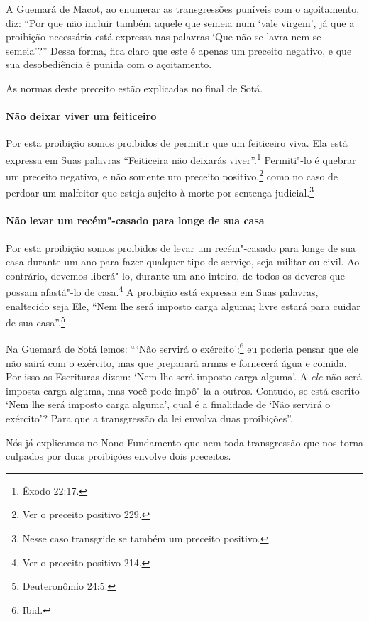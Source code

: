 \begin{multicols}{2}
A Guemará\starr{} de Macot\starr, ao enumerar as transgressões puníveis com o
açoitamento, diz: ``Por que não incluir também aquele que semeia num
`vale virgem', já que a proibição necessária está expressa nas palavras
`Que não se lavra nem se semeia'?'' Dessa forma, fica claro que este é
apenas um preceito negativo, e que sua desobediência é punida com o
açoitamento.

As normas deste preceito estão explicadas no final de Sotá\starr.

\paragraph{Não deixar viver um feiticeiro}

Por esta proibição somos proibidos de permitir que um feiticeiro viva.
Ela está expressa em Suas palavras ``Feiticeira não deixarás viver''.\footnote{Êxodo 22:17.} Permiti"-lo é quebrar um preceito negativo, e não somente um
preceito positivo,\footnote{Ver o preceito positivo 229.} como no caso de perdoar um
malfeitor que esteja sujeito à morte por sentença
judicial.\footnote{Nesse caso transgride se também um preceito positivo.}

\paragraph{Não levar um recém"-casado para longe de sua casa}

Por esta proibição somos proibidos de levar um recém"-casado para longe
de sua casa durante um ano para fazer qualquer tipo de serviço, seja
militar ou civil. Ao contrário, devemos liberá"-lo, durante um ano
inteiro, de todos os deveres que possam afastá"-lo de
casa.\footnote{Ver o preceito positivo 214.} A proibição está expressa em Suas palavras,
enaltecido seja Ele, ``Nem lhe será imposto carga alguma; livre estará
para cuidar de sua casa''.\footnote{Deuteronômio 24:5.}

Na Guemará\starr{} de Sotá\starr{} lemos: ```Não servirá o exército':\footnote{Ibid.} eu
poderia pensar que ele não sairá com o exército, mas que preparará armas
e fornecerá água e comida. Por isso as Escrituras dizem: `Nem lhe será
imposto carga alguma'. A \emph{ele} não será imposta carga alguma, mas
você pode impô"-la a outros. Contudo, se está escrito `Nem lhe será
imposto carga alguma', qual é a finalidade de `Não servirá o exército'?
Para que a transgressão da lei envolva duas proibições''.

Nós já explicamos no Nono Fundamento que nem toda transgressão que nos
torna culpados por duas proibições envolve dois preceitos.


\end{multicols}
